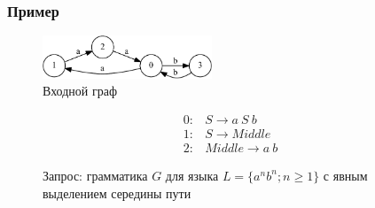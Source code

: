 \documentclass{beamer}
\begin{document}
\begin{frame}[fragile]
  \transwipe[direction=90]
  \frametitle{Пример}
\begin{figure}[ht]
    \centering
        \includegraphics[width=0.45\textwidth]{pictures/input.pdf}
        \caption{Входной граф}
\end{figure}
\begin{figure}[ht]
\centering
   \[
\begin{array}{rl} 
   0:& S \rightarrow a \ S \ b \\
   1:& S \rightarrow Middle \\
   2:& Middle \rightarrow a \ b
\end{array}
\]
   \caption{Запрос: грамматика $G$ для языка $L=\{a^n b^n; n \geq 1\}$ с явным выделением середины пути}
   \label{grammarG}        
    \end{figure}

\end{frame}
\end{document}
